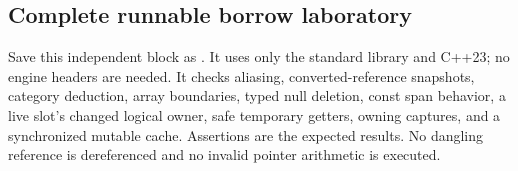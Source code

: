 \subsection{Complete runnable borrow laboratory}\label{05-engine-i-ch004-complete-runnable-borrow-laboratory}

\hypertarget{05-engine-i-ch004-complete-runnable-borrow-laboratory}{}

Save this independent block as . It uses only the standard library and C++23; no engine headers are needed. It checks aliasing, converted-reference snapshots, category deduction, array boundaries, typed null deletion, const span behavior, a live slot's changed logical owner, safe temporary getters, owning captures, and a synchronized mutable cache. Assertions are the expected results. No dangling reference is dereferenced and no invalid pointer arithmetic is executed.

